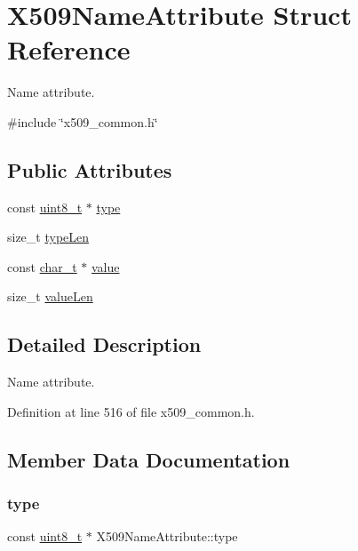 \hypertarget{structX509NameAttribute}{}\section{X509\+Name\+Attribute Struct Reference}
\label{structX509NameAttribute}


Name attribute.  




{\ttfamily \#include \char`\"{}x509\+\_\+common.\+h\char`\"{}}

\subsection*{Public Attributes}
\begin{DoxyCompactItemize}
\item 
const \hyperlink{stdint_8h_aba7bc1797add20fe3efdf37ced1182c5}{uint8\+\_\+t} $\ast$ \hyperlink{structX509NameAttribute_a66dff073fff9aec0c164a6dfaa81a523}{type}
\item 
size\+\_\+t \hyperlink{structX509NameAttribute_ac57d67161545c7a78f8997eac569320a}{type\+Len}
\item 
const \hyperlink{compiler__port_8h_a40bb5262bf908c328fbcfbe5d29d0201}{char\+\_\+t} $\ast$ \hyperlink{structX509NameAttribute_a282b457c4732701132df0b293cb7910c}{value}
\item 
size\+\_\+t \hyperlink{structX509NameAttribute_a265bb7fc7ba14428f029b10c2bd9db9d}{value\+Len}
\end{DoxyCompactItemize}


\subsection{Detailed Description}
Name attribute. 

Definition at line 516 of file x509\+\_\+common.\+h.



\subsection{Member Data Documentation}
\mbox{\label{structX509NameAttribute_a66dff073fff9aec0c164a6dfaa81a523}} 
\subsubsection{\texorpdfstring{type}{type}}
{\footnotesize\ttfamily const \hyperlink{stdint_8h_aba7bc1797add20fe3efdf37ced1182c5}{uint8\+\_\+t} $\ast$ X509\+Name\+Attribute\+::type}



